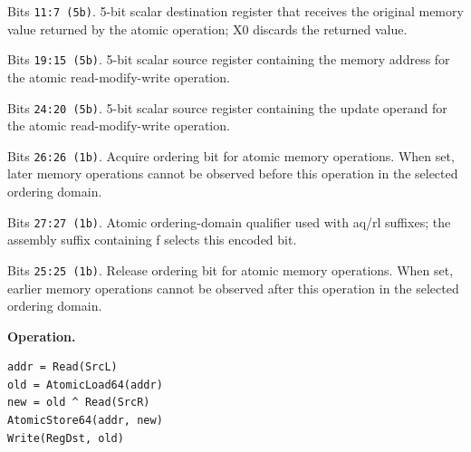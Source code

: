 \begin{description}[leftmargin=0.18\linewidth,style=nextline]
\item[\texttt{RegDst}] Bits \texttt{11:7 (5b)}. 5-bit scalar destination register that receives the original memory value returned by the atomic operation; X0 discards the returned value.
\item[\texttt{SrcL}] Bits \texttt{19:15 (5b)}. 5-bit scalar source register containing the memory address for the atomic read-modify-write operation.
\item[\texttt{SrcR}] Bits \texttt{24:20 (5b)}. 5-bit scalar source register containing the update operand for the atomic read-modify-write operation.
\item[\texttt{aq}] Bits \texttt{26:26 (1b)}. Acquire ordering bit for atomic memory operations. When set, later memory operations cannot be observed before this operation in the selected ordering domain.
\item[\texttt{far}] Bits \texttt{27:27 (1b)}. Atomic ordering-domain qualifier used with aq/rl suffixes; the assembly suffix containing f selects this encoded bit.
\item[\texttt{rl}] Bits \texttt{25:25 (1b)}. Release ordering bit for atomic memory operations. When set, earlier memory operations cannot be observed after this operation in the selected ordering domain.
\end{description}
\noindent\textbf{Operation.}\par
\begin{lstlisting}[style=ptoscalarcode]
addr = Read(SrcL)
old = AtomicLoad64(addr)
new = old ^ Read(SrcR)
AtomicStore64(addr, new)
Write(RegDst, old)
\end{lstlisting}
\Needspace{0.08\textheight}
